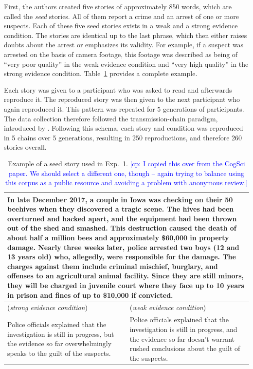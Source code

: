 \documentclass[11pt,a4paper]{article}
\newcommand{\cp}[1]{\textcolor{Blue}{[cp: #1]}}
\begin{document}
First, the authors created five stories of approximately 850 words, which are called the \emph{seed} stories. All of them report a crime and an arrest of one or more suspects. Each of these five seed stories exists in a weak and a strong evidence condition. The stories are identical up to the last phrase, which then either raises doubts about the arrest or emphasizes its validity. For example, if a suspect was arrested on the basis of camera footage, this footage was described as being of ``very poor quality'' in the weak evidence condition and ``very high quality'' in the strong evidence condition. Table~\ref{tab:examplestory} provides a complete example.

Each story was given to a participant who was asked to read and afterwards reproduce it. The reproduced story was then given to the next participant who again reproduced it. This pattern was repeated for 5 generations of participants. The data collection therefore followed the transmission-chain paradigm, introduced by \cite{Bartlett:1932}. Following this schema, each story and condition was reproduced in 5 chains over 5 generations, resulting in 250 reproductions, and therefore 260 stories overall. %

\begin{table}
\centering
\begin{tabular}{p{} p{}}
  \toprule
  \multicolumn{2}{p{0.925\textwidth}}{In late December 2017, a couple in Iowa was checking on their 50 beehives when they discovered a tragic scene. The hives had been overturned and hacked apart, and the equipment had been thrown out of the shed and smashed. This destruction caused the death of about half a million bees and approximately \$60,000 in property damage. Nearly three weeks later, police arrested two boys (12 and 13 years old) who, allegedly, were responsible for the damage. The charges against them include criminal mischief, burglary, and offenses to an agricultural animal facility. Since they are still minors, they will be charged in juvenile court where they face up to 10 years in prison and fines of up to \$10,000 if convicted.}\\ 
  \midrule
  (\emph{strong evidence condition}) & (\emph{weak evidence condition})  \\
  Police officials explained that the investigation is still in progress, but the evidence so far overwhelmingly speaks to the guilt of the suspects.  & Police officials explained that the investigation is still in progress, and the evidence so far doesn't warrant rushed conclusions about the guilt of the suspects. \\ 
  \bottomrule
\end{tabular}
\caption{Example of a seed story used in Exp.~1. \cp{I copied this over from the CogSci paper. We should select a different one, though -- again trying to balance using this corpus as a public resource and avoiding a problem with anonymous review.}}
\label{tab:examplestory}
\end{table}
\end{document}
